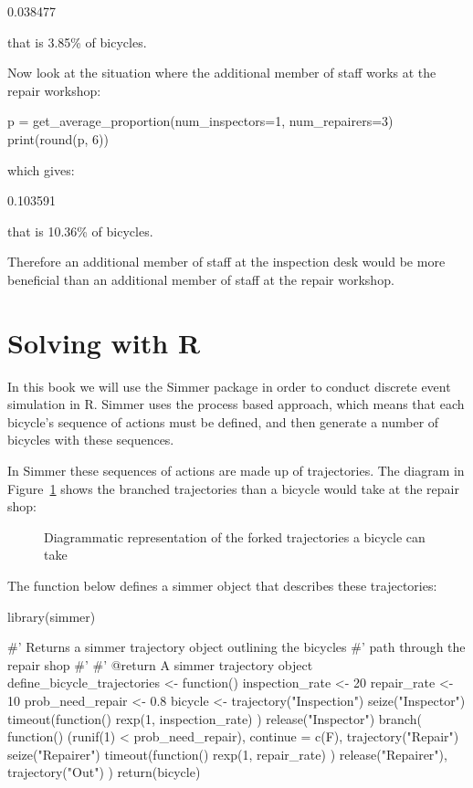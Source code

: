 \begin{pyout}
0.038477
\end{pyout}

that is 3.85\% of bicycles.

Now look at the situation where the additional member of staff works at the
repair workshop:

\begin{pyin}
p = get_average_proportion(num_inspectors=1, num_repairers=3)
print(round(p, 6))
\end{pyin}

which gives:

\begin{pyout}
0.103591
\end{pyout}

that is 10.36\% of bicycles.

Therefore an additional member of staff at the inspection desk would be more
beneficial than an additional member of staff at the repair workshop.


\section{Solving with R}\label{sec:solving-with-R}

In this book we will use the Simmer package in order to conduct discrete event
simulation in R.  Simmer uses the process based approach, which means that each
bicycle's sequence of actions must be defined, and then generate a number of
bicycles with these sequences.

In Simmer these sequences of actions are made up of trajectories. The
diagram in Figure~\ref{fig:processbased_diagram} shows the branched
trajectories than a bicycle would take at the repair shop:

\begin{figure}
\begin{center}

\caption{Diagrammatic representation of the forked trajectories a bicycle can take}
\label{fig:processbased_diagram}
\end{center}
\end{figure}

The function below defines a simmer object that describes these trajectories:

\begin{Rin}
library(simmer)

#' Returns a simmer trajectory object outlining the bicycles
#' path through the repair shop
#'
#' @return A simmer trajectory object
define_bicycle_trajectories <- function() {
  inspection_rate <- 20
  repair_rate <- 10
  prob_need_repair <- 0.8
  bicycle <-
    trajectory("Inspection") %
    seize("Inspector") %
    timeout(function() {
      rexp(1, inspection_rate)
    }) %
    release("Inspector") %
    branch(
      function() (runif(1) < prob_need_repair),
      continue = c(F),
      trajectory("Repair") %
        seize("Repairer") %
        timeout(function() {
          rexp(1, repair_rate)
        }) %
        release("Repairer"),
      trajectory("Out")
    )
  return(bicycle)
}
\end{Rin}

